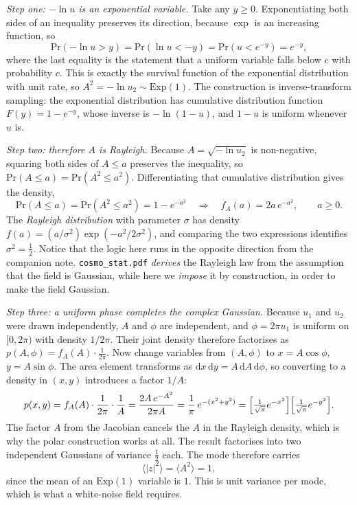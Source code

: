 \documentclass[12pt]{article}
\begin{document}
\emph{Step one: $-\ln u$ is an exponential variable.}  Take any
$y \ge 0$.  Exponentiating both sides of an inequality preserves its
direction, because $\exp$ is an increasing function, so
\begin{equation}
  \mathrm{Pr}(-\ln u > y) = \mathrm{Pr}(\ln u < -y) = \mathrm{Pr}(u < e^{-y}) = e^{-y},
\end{equation}
where the last equality is the statement that a uniform variable falls
below $c$ with probability $c$.  This is exactly the survival function
of the exponential distribution with unit rate, so
$A^2 = -\ln u_2 \sim \mathrm{Exp}(1)$.  The construction is
inverse-transform sampling: the exponential distribution has cumulative
distribution function $F(y) = 1 - e^{-y}$, whose inverse is
$-\ln(1-u)$, and $1-u$ is uniform whenever $u$ is.

\emph{Step two: therefore $A$ is Rayleigh.}  Because $A = \sqrt{-\ln
u_2}$ is non-negative, squaring both sides of $A \le a$ preserves the
inequality, so $\mathrm{Pr}(A \le a) = \mathrm{Pr}(A^2 \le a^2)$.
Differentiating that cumulative distribution gives the density,
\begin{equation}
  \mathrm{Pr}(A \le a) = \mathrm{Pr}(A^2 \le a^2) = 1 - e^{-a^2}
  \quad\Longrightarrow\quad
  f_A(a) = 2a\,e^{-a^2}, \qquad a \ge 0 .
\end{equation}
The \emph{Rayleigh distribution} with parameter $\sigma$ has density
$f(a) = (a/\sigma^2)\exp(-a^2/2\sigma^2)$, and comparing the two
expressions identifies $\sigma^2 = \tfrac12$.  Notice that the logic
here runs in the opposite direction from the companion note.
\texttt{cosmo\_stat.pdf} \emph{derives} the Rayleigh law from the
assumption that the field is Gaussian, while here we \emph{impose} it by
construction, in order to make the field Gaussian.

\emph{Step three: a uniform phase completes the complex Gaussian.}
Because $u_1$ and $u_2$ were drawn independently, $A$ and $\phi$ are
independent, and $\phi = 2\pi u_1$ is uniform on $[0, 2\pi)$ with
density $1/2\pi$.  Their joint density therefore factorises as
$p(A, \phi) = f_A(A)\cdot\tfrac{1}{2\pi}$.  Now change variables from
$(A, \phi)$ to $x = A\cos\phi$, $y = A\sin\phi$.  The area element
transforms as $\mathrm dx\,\mathrm dy = A\,\mathrm dA\,\mathrm d\phi$,
so converting to a density in $(x, y)$ introduces a factor $1/A$:
\begin{equation}
  p(x,y) = f_A(A)\cdot\frac{1}{2\pi}\cdot\frac{1}{A}
         = \frac{2A\,e^{-A^2}}{2\pi A}
         = \frac{1}{\pi}\,e^{-(x^2+y^2)}
         = \Bigl[\tfrac{1}{\sqrt\pi}e^{-x^2}\Bigr]
           \Bigl[\tfrac{1}{\sqrt\pi}e^{-y^2}\Bigr].
\end{equation}
The factor $A$ from the Jacobian cancels the $A$ in the Rayleigh
density, which is why the polar construction works at all.  The result
factorises into two independent Gaussians of variance $\tfrac12$ each.
The mode therefore carries
\begin{equation}
  \langle|z|^2\rangle = \langle A^2\rangle = 1,
\end{equation}
since the mean of an $\mathrm{Exp}(1)$ variable is $1$.  This is unit
variance per mode, which is what a white-noise field requires.
\end{document}
